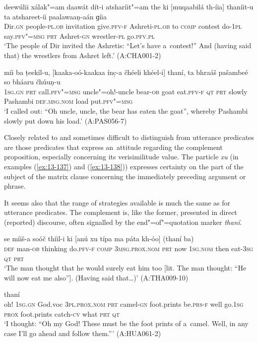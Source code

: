 \begin{exe}
\ex
\label{ex:13-135}
\gll deewúlii xálak"=am daawát dít-i  atsharíit"=am the ki [muqaabilá
  th-íia]  thaníit-u ta atshareet-íi paalawaaṇ-aán ɡíia \\
Dir.\textsc{gn} people-\textsc{pl.ob} invitation give.\textsc{pfv-f}  Ashreti-\textsc{pl.ob} to \textsc{comp} contest do-\textsc{1pl}  say.\textsc{pfv"=msg} \textsc{prt} Ashret-\textsc{gn} wrestler-\textsc{pl} go.\textsc{pfv.pl} \\
\glt `The people of Dir invited the Ashretis: ``Let's have a~contest!'' And (having said that) the wrestlers from Ashret left.' (A:CHA001-2)

\ex
\label{ex:13-136}
\gll míi ba ṭeekíl-u, [kaaka-oó-kaakaa ínc̣-a čhéeli  khéel-i]
thaní, ta bhraáš pašambeé so  bháaru čhúuṇ-u \\
\textsc{1sg.gn} \textsc{prt} call.\textsc{pfv"=msg} uncle"=oh!-uncle bear-\textsc{ob} goat  eat.\textsc{pfv-f} \textsc{qt } \textsc{prt} slowly Pashambi \textsc{def.msg.nom} load put.\textsc{pfv"=msg}  \\
\glt `I called out: ``Oh uncle, uncle, the bear has eaten the goat'', whereby Pashambi slowly put down his load.' (A:PAS056-7) 
\end{exe}

 Closely related to and sometimes difficult to distinguish from utterance predicates are those predicates that express an~attitude regarding the complement proposition, especially concerning its verisimilitude value. The particle \textit{xu} (in examples (\ref{ex:13-137}) and (\ref{ex:13-138})) expresses certainty on the part of the subject of the matrix clause concerning the immediately preceding argument or phrase.


It seems also that the range of strategies available is much the same as for utterance predicates. The complement is, like the former, presented in direct (reported) discourse, often signalled by the end"=of"=quotation marker \textit{thaní}. 

\begin{exe}
\ex
\label{ex:13-137}
\gll se míiš-a soóč thíil-i ki [anú xu  típa ma páta kh-óo] (thaní ba) \\
\textsc{def } man-\textsc{ob} thinking do.\textsc{pfv-f} \textsc{comp} \textsc{3msg.prox.nom} \textsc{prt}  now \textsc{1sg.nom} then eat-\textsc{3sg} \textsc{qt} \textsc{prt} \\
\glt `The man thought that he would surely eat him too [lit. The man thought: ``He will now eat me also'']. (Having said that{\ldots})' (A:THA009-10)

\ex
\label{ex:13-138}
 thaní \\
oh! \textsc{1sg.gn} God.voc \textsc{3pl.prox.nom} \textsc{prt} camel-\textsc{gn}  foot.prints be.\textsc{prs-f} well go.\textsc{1sg} \textsc{prox} foot.prints catch-\textsc{cv} what \textsc{prt} \textsc{qt } \\
\glt `I thought: ``Oh my God! These must be the foot prints of a~camel. Well, in any case I'll go ahead and follow them.''' (A:HUA061-2) 
\end{exe}

